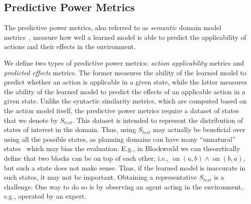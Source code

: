 \documentclass[letterpaper]{article} %
\newcommand{\stest}{\ensuremath{S_{\textit{test}}}\xspace}
\newif\ifaddcomments
\newcommand{\roni}[1]{\ifaddcomments{\textcolor{red}{[Roni: #1]}}\fi}
\newcommand{\cm}[1]{\ifaddcomments{\textcolor{olive}{[Christian: #1]}}\fi}
\begin{document}
\subsection{Predictive Power Metrics}
\label{sec:predictiveness-metrics}
The predictive power metrics, also referred to as \emph{semantic} domain model metrics~\citep{aineto2019learning,mordoch2024safe,le2024learning}, measure how well a learned model is able to predict the applicability of actions and their effects in the environment. 



We define two types of predictive power metrics: \emph{action applicability} metrics and \emph{predicted effects} metrics. 
The former measures the ability of the learned model to predict whether an action is applicable in a given state, while the latter measures the ability of the learned model to predict the effects of an applicable action in a given state.
Unlike the syntactic similarity metrics, which are computed based on the action model itself, the predictive power metrics require a dataset of states that we denote by $\stest$. 
This dataset is intended to represent the distribution of states of interest in the domain. 
Thus, using \stest may actually be beneficial over using all the possible states, as planning domains can have many ``unnatural'' states~\cite{grundke2024frepr} which may bias the evaluation. 
E.g., in Blockworld we can theoretically define that two blocks can be on top of each other, i.e., $\operatorname{on}(a, b) \wedge \operatorname{on}(b, a)$, but such a state does not make sense. Thus, if the learned model is inaccurate in such states, it may not be important. 
Obtaining a representative $\stest$ is a challenge. One way to do so is by observing an agent acting in the environment, e.g., operated by an expert. 
\end{document}
